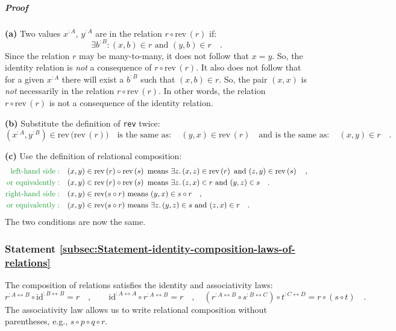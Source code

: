 \subparagraph{Proof}

\textbf{(a)} Two values $x^{:A}$, $y^{:A}$ are in the relation $r\circ\text{rev}\,(r)$
if:
\[
\exists b^{:B}:(x,b)\in r\text{ and }(y,b)\in r\quad.
\]
Since the relation $r$ may be many-to-many, it does not follow that
$x=y$. So, the identity relation is \emph{not} a consequence of $r\circ\text{rev}\,(r)$.
It also does not follow that for a given $x^{:A}$ there will exist
a $b^{:B}$ such that $(x,b)\in r$. So, the pair $\left(x,x\right)$
is \emph{not} necessarily in the relation $r\circ\text{rev}\,(r)$.
In other words, the relation $r\circ\text{rev}\,(r)$ is not a consequence
of the identity relation.

\textbf{(b)} Substitute the definition of \lstinline!rev! twice:
\[
(x^{:A},y^{:B})\in\text{rev}\,\big(\text{rev}\,(r)\big)\quad\text{is the same as}:\quad(y,x)\in\text{rev}\,(r)\quad\text{and is the same as}:\quad(x,y)\in r\quad.
\]

\textbf{(c)} Use the definition of relational composition:
\begin{align*}
{\color{greenunder}\text{left-hand side}:}\quad & (x,y)\in\text{rev}\left(r\right)\circ\text{rev}\left(s\right)\text{ means }\exists z.\,(x,z)\in\text{rev}\left(r\right)\text{ and }(z,y)\in\text{rev}\left(s\right)\quad,\\
{\color{greenunder}\text{or equivalently}:}\quad & (x,y)\in\text{rev}\left(r\right)\circ\text{rev}\left(s\right)\text{ means }\exists z.\,(z,x)\in r\text{ and }(y,z)\in s\quad.\\
{\color{greenunder}\text{right-hand side}:}\quad & (x,y)\in\text{rev}(s\circ r)\text{ means }(y,x)\in s\circ r\quad,\\
{\color{greenunder}\text{or equivalently}:}\quad & (x,y)\in\text{rev}(s\circ r)\text{ means }\exists z.\,(y,z)\in s\text{ and }(z,x)\in r\quad.
\end{align*}
The two conditions are now the same.

\subsubsection{Statement \label{subsec:Statement-identity-composition-laws-of-relations}\ref{subsec:Statement-identity-composition-laws-of-relations}}

The composition of relations satisfies the identity
and associativity
laws:
\[
r^{:A\leftrightarrow B}\circ\text{id}^{:B\leftrightarrow B}=r\quad,\quad\quad\text{id}^{:A\leftrightarrow A}\circ r^{:A\leftrightarrow B}=r\quad,\quad(r^{:A\leftrightarrow B}\circ s^{:B\leftrightarrow C})\circ t^{:C\leftrightarrow D}=r\circ(s\circ t)\quad.
\]
The associativity law allows us to write relational composition without
parentheses, e.g., $s\circ p\circ q\circ r$.


